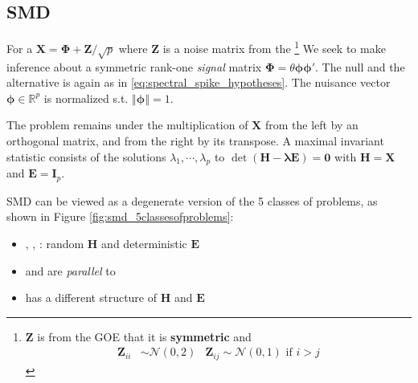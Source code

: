 \documentclass[twoside]{article}
\begin{document}
\subsection{SMD}
For a $\mathbf{X} = \boldsymbol{\Phi} + \mathbf{Z}/\sqrt{p}$ where $\mathbf{Z}$ is a noise matrix from the \footnote{$\mathbf{Z}$ is from the GOE that it is \textbf{symmetric} and \begin{align*} \mathbf{Z}_{ii} &\sim \mathcal{N}(0,2) & \mathbf{Z}_{ij}\sim\mathcal{N}(0,1) \text{ if }i>j \end{align*} }
We seek to make inference about a symmetric rank-one \textit{signal} matrix $\boldsymbol{\Phi} = \theta\boldsymbol{\phi\phi}'$. The null and the alternative is again as in \ref{eq:spectral_spike_hypotheses}. The nuisance vector $\boldsymbol{\phi}\in\mathbb{R}^p$ is normalized s.t. $\left\Vert \boldsymbol{\phi} \right\Vert =1$. 

The problem remains  under the multiplication of $\mathbf{X}$ from the left by an orthogonal matrix, and from the right by its transpose.
A maximal invariant statistic consists of the solutions $\lambda_1,\cdots,\lambda_p$ to $\det \left( \mathbf{H}-\boldsymbol{\lambda }\mathbf{E} \right)=\mathbf{0} $ with $\mathbf{H}=\mathbf{X}$ and $\mathbf{E}=\mathbf{I}_p$.

SMD can be viewed as a degenerate version of the 5 classes of problems, as shown in Figure \ref{fig:smd_5classesofproblems}:
\begin{itemize}
    \item {}, , : random $\mathbf{H}$ and deterministic $\mathbf{E}$
    \item {} and  are \textit{parallel} to 
    \item {} has a different structure of $\mathbf{H}$ and $\mathbf{E}$
\end{itemize}
\end{document}
